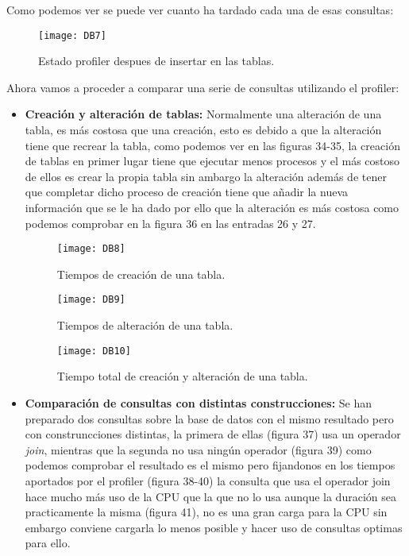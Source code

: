 \documentclass[a4paper, 10pt]{article} %
\begin{document}
Como podemos ver se puede ver cuanto ha tardado cada una de esas consultas:
\begin{figure}[H]
\centering 
\texttt{[image: DB7]} 
\caption{Estado profiler despues de insertar en las tablas.} 
\label{contexto:figura} 
\end{figure}
Ahora vamos a proceder a comparar una serie de consultas utilizando el profiler:
\begin{itemize}
\item \textbf{Creación y alteración de tablas:} Normalmente una alteración de una tabla, es más costosa que una creación, esto es debido a que la alteración tiene que recrear la tabla, como podemos ver en las figuras 34-35, la creación de tablas en primer lugar tiene que ejecutar menos procesos y el más costoso de ellos es crear la propia tabla sin ambargo la alteración además de tener que completar dicho proceso de creación tiene que añadir la nueva información que se le ha dado por ello que la alteración es más costosa como podemos comprobar en la figura 36 en las entradas 26 y 27.
\begin{figure}[H]
\centering 
\texttt{[image: DB8]} 
\caption{Tiempos de creación de una tabla.} 
\label{contexto:figura} 
\end{figure}
\begin{figure}[H]
\centering 
\texttt{[image: DB9]} 
\caption{Tiempos de alteración de una tabla.} 
\label{contexto:figura} 
\end{figure}
\begin{figure}[H]
\centering 
\texttt{[image: DB10]} 
\caption{Tiempo total de creación y alteración de una tabla.} 
\label{contexto:figura} 
\end{figure}
\item \textbf{Comparación de consultas con distintas construcciones:} Se han preparado dos consultas sobre la base de datos con el mismo resultado pero con construncciones distintas, la primera de ellas (figura 37) usa un operador \textit{join}, mientras que la segunda no usa ningún operador (figura 39) como podemos comprobar el resultado es el mismo pero fijandonos en los tiempos aportados por el profiler (figura 38-40) la consulta que usa el operador join hace mucho más uso de la CPU que la que no lo usa aunque la duración sea practicamente la misma (figura 41), no es una gran carga para la CPU sin embargo conviene cargarla lo menos posible y hacer uso de consultas optimas para ello.
\begin{figure}[H]

\end{figure}
\end{itemize}
\end{document}
